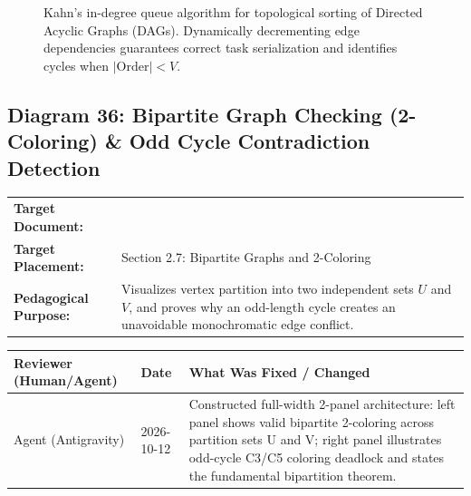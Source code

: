 \documentclass[11pt,a4paper]{article}
\newcommand{\breadcrumb}[3]{
    \par\vspace{0.15cm}
    \noindent\begin{tabularx}{\textwidth}{|l|X|}
    \hline
    \textbf{Target Document:} & \texttt{\detokenize{#1}} \\
    \textbf{Target Placement:} & #2 \\
    \textbf{Pedagogical Purpose:} & #3 \\
    \hline
    \end{tabularx}
    \vspace{0.15cm}\par
}
\newcommand{\diagramaudit}[3]{
    \par\vspace{0.12cm}
    \noindent\begin{tabularx}{\textwidth}{|l|l|>{\raggedright\arraybackslash}X|}
    \hline
    \textbf{Reviewer (Human/Agent)} & \textbf{Date} & \textbf{What Was Fixed / Changed} \\ \hline
    #1 & #2 & #3 \\ \hline
    \end{tabularx}
    \vspace{0.12cm}\par
}
\begin{document}
\begin{figure}[htbp]
{}
\caption{Kahn's in-degree queue algorithm for topological sorting of Directed Acyclic Graphs (DAGs). Dynamically decrementing edge dependencies guarantees correct task serialization and identifies cycles when $|\text{Order}| < V$.}
\end{figure}

\newpage
\newpage
\newpage

\subsection[Diagram 36: Bipartite 2-Coloring and Odd Cycle Contradiction]{Diagram 36: Bipartite Graph Checking (2-Coloring) \& Odd Cycle Contradiction Detection}

\breadcrumb{07.graph_algorithms.tex}{Section 2.7: Bipartite Graphs and 2-Coloring}{Visualizes vertex partition into two independent sets $U$ and $V$, and proves why an odd-length cycle creates an unavoidable monochromatic edge conflict.}

\diagramaudit{Agent (Antigravity)}{2026-10-12}{Constructed full-width 2-panel architecture: left panel shows valid bipartite 2-coloring across partition sets U and V; right panel illustrates odd-cycle C3/C5 coloring deadlock and states the fundamental bipartition theorem.}
\end{document}

